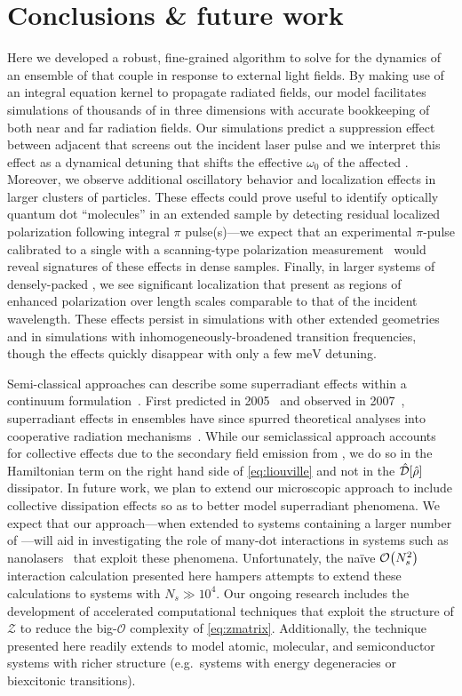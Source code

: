 \section{\label{section:conclusion}Conclusions \& future work}
Here we developed a robust, fine-grained algorithm to solve for the dynamics of an ensemble of \qds{} that couple in response to external light fields.
By making use of an integral equation kernel to propagate radiated fields, our model facilitates simulations of thousands of \qds{} in three dimensions with accurate bookkeeping of both near and far radiation fields.
Our simulations predict a suppression effect between adjacent \qds{} that screens out the incident laser pulse and we interpret this effect as a dynamical detuning that shifts the effective $\omega_0$ of the affected \qds{}.
Moreover, we observe additional oscillatory behavior and localization effects in larger clusters of particles.
These effects could prove useful to identify optically quantum dot ``molecules'' in an extended sample by detecting residual localized polarization following integral $\pi$ pulse(s)---we expect that an experimental $\pi$-pulse calibrated to a single \qd{} with a scanning-type polarization measurement~\cite{Asakura2013} would reveal signatures of these effects in dense samples.
Finally, in larger systems of densely-packed \qds{}, we see significant localization that present as regions of enhanced polarization over length scales comparable to that of the incident wavelength.
These effects persist in simulations with other extended geometries and in simulations with inhomogeneously-broadened transition frequencies, though the effects quickly disappear with only a few $\si{\milli\eV}$ detuning.

Semi-classical approaches can describe some superradiant effects within a continuum formulation~\cite{Gross1982,PhysRevA.4.302,PhysRevA.4.854}.
First predicted in 2005~\cite{Temnov2005} and observed in 2007~\cite{Scheibner2007}, superradiant effects in \qd{} ensembles have since spurred theoretical analyses into cooperative radiation mechanisms~\cite{Temnov2009,Chen2008}.
While our semiclassical approach accounts for collective effects due to the secondary field emission from \qds{}, we do so in the Hamiltonian term on the right hand side of \cref{eq:liouville} and not in the $\hat{\mathcal{D}}\qty[\hat{\rho}]$ dissipator.
In future work, we plan to extend our microscopic approach to include collective dissipation effects so as to better model superradiant phenomena.
We expect that our approach---when extended to systems containing a larger number of \qds{}---will aid in investigating the role of many-dot interactions in systems such as nanolasers~\cite{jahnke2016giant} that exploit these phenomena.
Unfortunately, the na\"ive $\mathcal{O}\qty(N_s^2)$ interaction calculation presented here hampers attempts to extend these calculations to systems with $N_s \gg 10^4$.
Our ongoing research includes the development of accelerated computational techniques that exploit the structure of $\mathcal{Z}$ to reduce the big-$\mathcal{O}$ complexity of \cref{eq:zmatrix}.
Additionally, the technique presented here readily extends to model atomic, molecular, and semiconductor systems with richer structure (e.g.\ systems with energy degeneracies or biexcitonic transitions).

